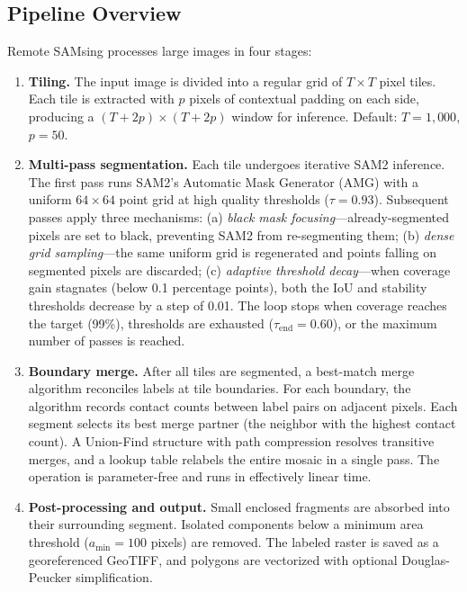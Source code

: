 \documentclass[review,11pt,authoryear]{elsarticle}
\begin{document}
\subsection{Pipeline Overview}
\label{sec:overview}

Remote SAMsing processes large images in four stages:

\begin{enumerate}
    \item \textbf{Tiling.} The input image is divided into a regular grid of $T \times T$ pixel tiles. Each tile is extracted with $p$ pixels of contextual padding on each side, producing a $(T + 2p) \times (T + 2p)$ window for inference. Default: $T = 1{,}000$, $p = 50$.

    \item \textbf{Multi-pass segmentation.} Each tile undergoes iterative SAM2 inference. The first pass runs SAM2's Automatic Mask Generator (AMG) with a uniform $64 \times 64$ point grid at high quality thresholds ($\tau = 0.93$). Subsequent passes apply three mechanisms: (a) \textit{black mask focusing}---already-segmented pixels are set to black, preventing SAM2 from re-segmenting them; (b) \textit{dense grid sampling}---the same uniform grid is regenerated and points falling on segmented pixels are discarded; (c) \textit{adaptive threshold decay}---when coverage gain stagnates (below 0.1 percentage points), both the IoU and stability thresholds decrease by a step of 0.01. The loop stops when coverage reaches the target (99\%), thresholds are exhausted ($\tau_{\text{end}} = 0.60$), or the maximum number of passes is reached.

    \item \textbf{Boundary merge.} After all tiles are segmented, a best-match merge algorithm reconciles labels at tile boundaries. For each boundary, the algorithm records contact counts between label pairs on adjacent pixels. Each segment selects its best merge partner (the neighbor with the highest contact count). A Union-Find structure with path compression resolves transitive merges, and a lookup table relabels the entire mosaic in a single pass. The operation is parameter-free and runs in effectively linear time.

    \item \textbf{Post-processing and output.} Small enclosed fragments are absorbed into their surrounding segment. Isolated components below a minimum area threshold ($a_{\min} = 100$ pixels) are removed. The labeled raster is saved as a georeferenced GeoTIFF, and polygons are vectorized with optional Douglas-Peucker simplification.
\end{enumerate}
\end{document}
